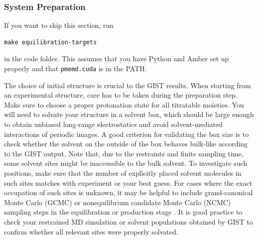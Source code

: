 \documentclass[9pt,tutorial]{livecoms}
\newcommand{\software}{\texttt}
\begin{document}
\subsubsection{System Preparation}
If you want to skip this section, run 
\begin{lstlisting}[style=bash]
make equilibration-targets
\end{lstlisting}
in the code folder. This assumes that you have Python and Amber set up properly and that \software{pmemd.cuda} is in the PATH.

The choice of initial structure is crucial to the GIST results.
When starting from an experimental structure, care has to be taken during the preparation step.
Make sure to choose a proper protonation state for all titratable moieties.
You will need to solvate your structure in a solvent box, which should be large enough to obtain unbiased long-range electrostatics and avoid solvent-mediated interactions of periodic images.
A good criterion for validating the box size is to check whether the solvent on the outside of the box behaves bulk-like according to the GIST output.
Note that, due to the restraints and finite sampling time, some solvent sites might be inaccessible to the bulk solvent.
To investigate such positions, make sure that the number of explicitly placed solvent molecules in such sites matches with experiment or your best guess. 
For cases where the exact occupation of such sites is unknown, it may be helpful to include grand-canonical Monte Carlo (GCMC) or nonequilibrium candidate Monte Carlo (NCMC) sampling steps in the equilibration or production stage \cite{Ge-GCMC2022,Melling-NCMC2023}.
It is good practice to check your restrained MD simulation or solvent populations obtained by GIST to confirm whether all relevant sites were properly solvated.
\end{document}
